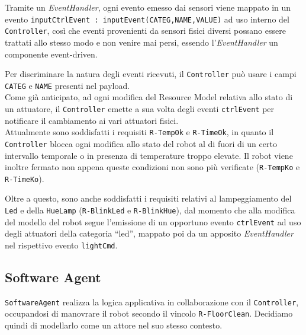 \documentclass{../llncs}
\newcommand{\codescript}[1]{{\mbox{\small{\texttt{#1}}}}\xspace}
\newcommand{\code}[1]{{\color{blue}\small{\texttt{#1}}}}
\newcommand{\labelssec}[1]{\label{ssec:#1}}
\begin{document}
Tramite un \emph{EventHandler}, ogni evento emesso dai sensori viene mappato in un evento \codescript{inputCtrlEvent : inputEvent(CATEG,NAME,VALUE)} ad uso interno del \texttt{Controller}, così che eventi provenienti da sensori fisici diversi possano essere trattati allo stesso modo e non venire mai persi, %
essendo l'\emph{EventHandler} un componente event-driven.

Per discriminare la natura degli eventi ricevuti, il \texttt{Controller} può usare i campi \codescript{CATEG} e \codescript{NAME} presenti nel payload.\\

Come già anticipato, ad ogni modifica del Resource Model relativa allo stato di un attuatore, il \texttt{Controller} emette a sua volta degli eventi \codescript{ctrlEvent} per notificare il cambiamento ai vari attuatori fisici.\\



Attualmente sono soddisfatti i requisiti \code{R-TempOk} e \code{R-TimeOk}, in quanto il \texttt{Controller} blocca ogni modifica allo stato del robot al di fuori di un certo intervallo temporale o in presenza di temperature troppo elevate. Il robot viene inoltre fermato non appena queste condizioni non sono più verificate (\code{R-TempKo} e \code{R-TimeKo}).

Oltre a questo, sono anche soddisfatti i requisiti relativi al lampeggiamento del \texttt{Led} e della \texttt{HueLamp} (\code{R-BlinkLed} e \code{R-BlinkHue}), dal momento che alla modifica del modello del robot segue l'emissione di un opportuno evento \codescript{ctrlEvent} ad uso degli attuatori della categoria ``led'', mappato poi da un apposito \emph{EventHandler} nel rispettivo evento \codescript{lightCmd}.\\



\subsection{Software Agent}
\labelssec{swagPA}
\texttt{SoftwareAgent} realizza la logica applicativa in collaborazione con il \texttt{Controller}, occupandosi di manovrare il robot secondo il vincolo \code{R-FloorClean}. Decidiamo quindi di modellarlo come un attore nel suo stesso contesto.
\end{document}
